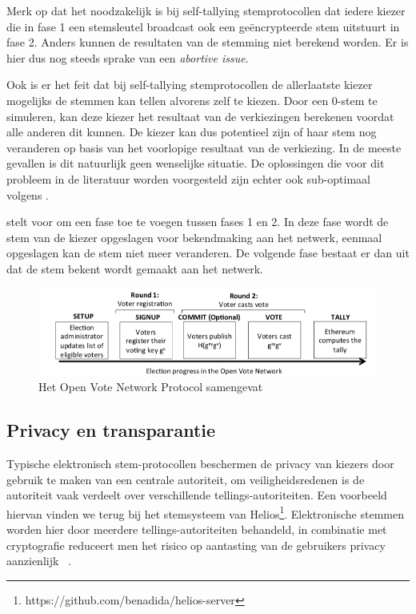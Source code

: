 			Merk op dat het noodzakelijk is bij self-tallying stemprotocollen dat iedere kiezer die in fase 1 een stemsleutel broadcast ook een geëncrypteerde stem uitstuurt in fase 2. Anders kunnen de resultaten van de stemming niet berekend worden. Er is hier dus nog steeds sprake van een \textit{abortive issue}.
			
			Ook is er het feit dat bij self-tallying stemprotocollen de allerlaatste kiezer mogelijks de stemmen kan tellen alvorens zelf te kiezen. Door een 0-stem te simuleren, kan deze kiezer het resultaat van de verkiezingen berekenen voordat alle anderen dit kunnen. De kiezer kan dus potentieel zijn of haar stem nog veranderen op basis van het voorlopige resultaat van de verkiezing. In de meeste gevallen is dit natuurlijk geen wenselijke situatie. De oplossingen die voor dit probleem in de literatuur worden voorgesteld zijn echter ook sub-optimaal volgens \textcite{McCorry2017}. 
			
			\textcite{McCorry2017} stelt voor om een fase toe te voegen tussen fases 1 en 2. In deze fase wordt de stem van de kiezer opgeslagen voor bekendmaking aan het netwerk, eenmaal opgeslagen kan de stem niet meer veranderen. De volgende fase bestaat er dan uit dat de stem bekent wordt gemaakt aan het netwerk. 

			\begin{figure}
				\includegraphics[width=\linewidth]{img/ovnp.png}
				\caption{Het Open Vote Network Protocol samengevat}
				\label{fig:ovnp}
			\end{figure} 
	
	\newpage
	\subsection{Privacy en transparantie}
		Typische elektronisch stem-protocollen beschermen de privacy van kiezers door gebruik te maken van een centrale autoriteit, om veiligheidsredenen is de autoriteit vaak verdeelt over verschillende tellings-autoriteiten. Een voorbeeld hiervan vinden we terug bij het stemsysteem van Helios\footnote{https://github.com/benadida/helios-server}. Elektronische stemmen worden hier door meerdere tellings-autoriteiten behandeld, in combinatie met cryptografie reduceert men het risico op aantasting van de gebruikers privacy aanzienlijk ~\autocite{Adida2008}. 
	
